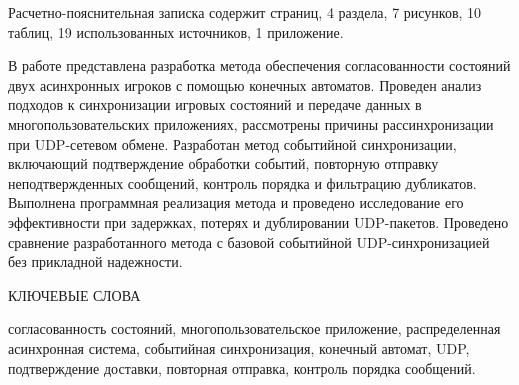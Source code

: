 \begin{essay}{}
	Расчетно-пояснительная записка содержит \pageref{LastPage} страниц, 4 раздела, 7 рисунков, 10 таблиц, 19 использованных источников, 1 приложение.

	В работе представлена разработка метода обеспечения согласованности состояний двух асинхронных игроков с помощью конечных автоматов. Проведен анализ подходов к синхронизации игровых состояний и передаче данных в многопользовательских приложениях, рассмотрены причины рассинхронизации при UDP-сетевом обмене. Разработан метод событийной синхронизации, включающий подтверждение обработки событий, повторную отправку неподтвержденных сообщений, контроль порядка и фильтрацию дубликатов. Выполнена программная реализация метода и проведено исследование его эффективности при задержках, потерях и дублировании UDP-пакетов. Проведено сравнение разработанного метода с базовой событийной UDP-синхронизацией без прикладной надежности.

	КЛЮЧЕВЫЕ СЛОВА

	согласованность состояний, многопользовательское приложение, распределенная асинхронная система, событийная синхронизация, конечный автомат, UDP, подтверждение доставки, повторная отправка, контроль порядка сообщений.
\end{essay}
